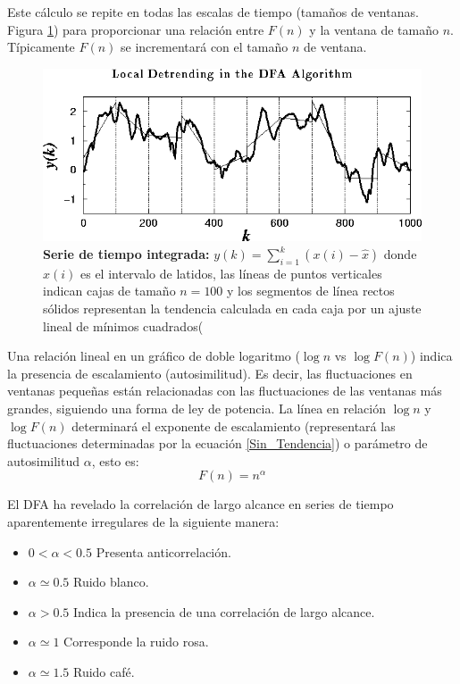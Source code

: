 \documentclass[letterpaper,titlepage,12pt,draft]{report}
\begin{document}
Este c\'alculo se repite en todas las escalas de tiempo (tama\~nos de ventanas. Figura \ref{fig:DFA2}) para proporcionar una relaci\'on entre $F(n)$ y la ventana de tama\~no $n$. T\'ipicamente $F(n)$ se incrementar\'a con el tama\~no $n$ de ventana.\\

\begin{figure}[h]
\begin{center}
\includegraphics[scale=0.5]{DFA2.png}
\caption{{\bf Serie de tiempo integrada:} $\displaystyle y(k)=\sum_{i=1}^{k}(x(i)-\hat{x})$ donde $x(i)$ es el intervalo de latidos, las l\'ineas de puntos verticales indican cajas de tama\~no $n=100$ y los segmentos de l\'inea rectos s\'olidos representan la tendencia calculada en cada caja por un ajuste lineal de m\'inimos cuadrados(\cite{Goldberger}}
\label{fig:DFA2}
\end{center}
\end{figure}

Una relaci\'on lineal en un gr\'afico de doble logaritmo ($\log n$ vs $\log F(n)$) indica la presencia de escalamiento (autosimilitud). Es decir, las fluctuaciones en ventanas peque\~nas est\'an relacionadas con las fluctuaciones de las ventanas m\'as grandes, siguiendo una forma de ley de potencia. La l\'inea en relaci\'on $\log n$ y $\log F(n)$ determinar\'a el exponente de escalamiento (representar\'a las fluctuaciones determinadas por la ecuaci\'on \eqref{Sin_Tendencia}) o par\'ametro de autosimilitud $\alpha$, esto es: 
\begin{equation}
F(n)=n^{\alpha}
\end{equation}
 
El DFA ha revelado la correlaci\'on de largo alcance en series de tiempo aparentemente irregulares \cite{Peng} de la siguiente manera:
\begin{itemize}
\item $0<\alpha<0.5$ Presenta anticorrelaci\'on.
\item $\alpha\simeq0.5$ Ruido blanco.
\item $\alpha>0.5$ Indica la presencia de una correlaci\'on de largo alcance. 
\item $\alpha\simeq1$ Corresponde la ruido rosa.
\item $\alpha\simeq1.5$ Ruido caf\'e.
\end{itemize}
\end{document}
